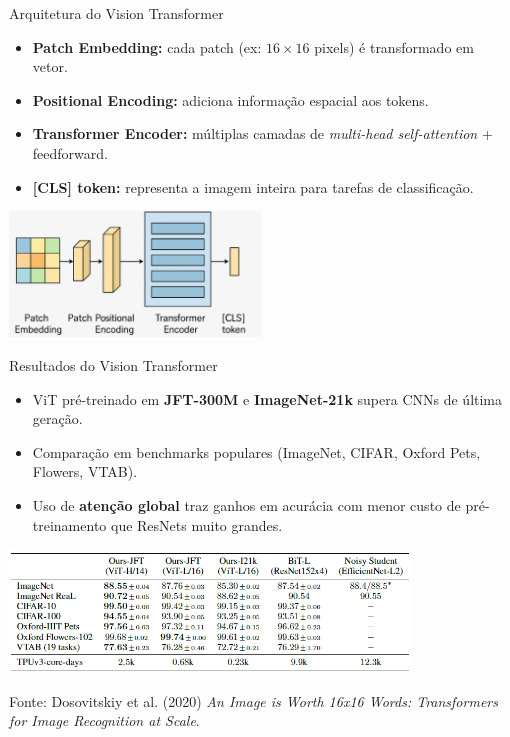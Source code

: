 \documentclass{beamer}
\begin{document}
\begin{frame}{Arquitetura do Vision Transformer}
	\begin{itemize}
		\item \textbf{Patch Embedding:} cada patch (ex: $16\times16$ pixels) é transformado em vetor.
		\item \textbf{Positional Encoding:} adiciona informação espacial aos tokens.
		\item \textbf{Transformer Encoder:} múltiplas camadas de \textit{multi-head self-attention} + feedforward.
		\item \textbf{[CLS] token:} representa a imagem inteira para tarefas de classificação.
	\end{itemize}
\vspace{0.1cm}
	\begin{center}
	    \includegraphics[width=0.5\textwidth]{assets/vit_architecture.png}
	\end{center}
\end{frame}

\begin{frame}{Resultados do Vision Transformer}
\begin{itemize}
    \item ViT pré-treinado em \textbf{JFT-300M} e \textbf{ImageNet-21k} supera CNNs de última geração.
    \item Comparação em benchmarks populares (ImageNet, CIFAR, Oxford Pets, Flowers, VTAB).
    \item Uso de \textbf{atenção global} traz ganhos em acurácia com menor custo de pré-treinamento que ResNets muito grandes.
\end{itemize}

\vspace{0.3cm}
\begin{center}
    \includegraphics[width=0.8\textwidth]{assets/vit_results.png}
\end{center}

\tiny Fonte: Dosovitskiy et al. (2020) \textit{An Image is Worth 16x16 Words: Transformers for Image Recognition at Scale}.
\end{frame}
\end{document}

